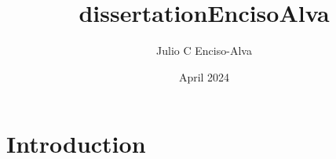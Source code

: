 \documentclass{article}
\title{dissertationEncisoAlva}
\author{Julio C Enciso-Alva}
\date{April 2024}
\begin{document}
\maketitle

\section{Introduction}
\end{document}
